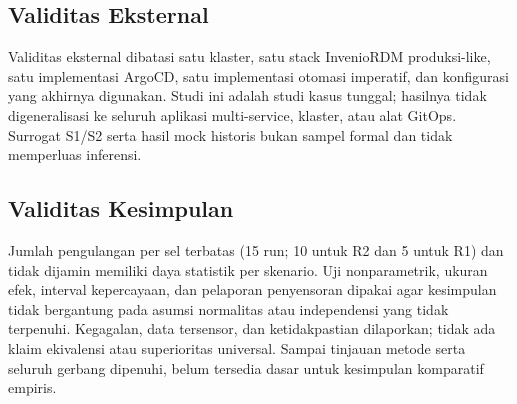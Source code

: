 \subsection{Validitas Eksternal}

Validitas eksternal dibatasi satu klaster, satu stack InvenioRDM produksi-like, satu implementasi ArgoCD, satu implementasi otomasi imperatif, dan konfigurasi yang akhirnya digunakan. Studi ini adalah studi kasus tunggal; hasilnya tidak digeneralisasi ke seluruh aplikasi multi-service, klaster, atau alat GitOps. Surrogat S1/S2 serta hasil mock historis bukan sampel formal dan tidak memperluas inferensi.

\subsection{Validitas Kesimpulan}

Jumlah pengulangan per sel terbatas (15 run; 10 untuk R2 dan 5 untuk R1) dan tidak dijamin memiliki daya statistik per skenario. Uji nonparametrik, ukuran efek, interval kepercayaan, dan pelaporan penyensoran dipakai agar kesimpulan tidak bergantung pada asumsi normalitas atau independensi yang tidak terpenuhi. Kegagalan, data tersensor, dan ketidakpastian dilaporkan; tidak ada klaim ekivalensi atau superioritas universal. Sampai tinjauan metode serta seluruh gerbang dipenuhi, belum tersedia dasar untuk kesimpulan komparatif empiris.
